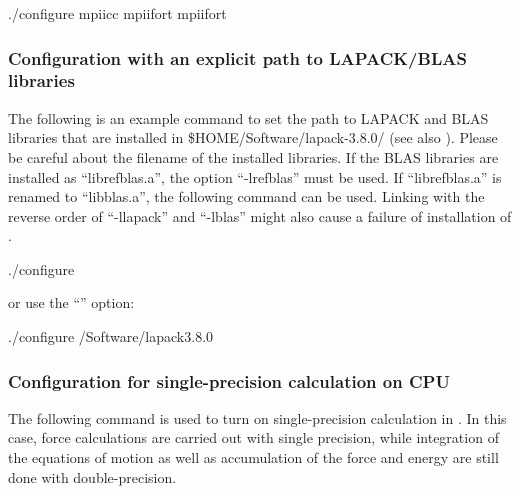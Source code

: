 \documentclass[a4paper,11pt,oneside,english]{sphinxmanual}
\begin{document}
\begin{sphinxVerbatim}[commandchars=\\\{\}]
\PYGZdl{} ./configure mpiicc mpiifort mpiifort
\end{sphinxVerbatim}


\subsubsection{Configuration with an explicit path to LAPACK/BLAS libraries}
\label{\detokenize{01_Getting_Started:configuration-with-an-explicit-path-to-lapack-blas-libraries}}
The following is an example command to set the path to LAPACK and BLAS libraries
that are installed in \$HOME/Software/lapack-3.8.0/ (see also {\hyperref[\detokenize{98_Appendix:appendix}]{}}).
Please be careful about the filename of the installed libraries.
If the BLAS libraries are installed as “librefblas.a”, the option “-lrefblas” must be used.
If “librefblas.a” is renamed to “libblas.a”, the following command can be used.
Linking with the reverse order of “-llapack” and “-lblas” might
also cause a failure of installation of .

\begin{sphinxVerbatim}[commandchars=\\\{\}]
\PYGZdl{} ./configure 
\end{sphinxVerbatim}

or use the “” option:

\begin{sphinxVerbatim}[commandchars=\\\{\}]
\PYGZdl{} ./configure /Software/lapack\PYGZhy{}3.8.0
\end{sphinxVerbatim}


\subsubsection{Configuration for single-precision calculation on CPU}
\label{\detokenize{01_Getting_Started:configuration-for-single-precision-calculation-on-cpu}}
The following command is used to turn on single-precision calculation in .
In this case, force calculations are carried out with single precision,
while integration of the equations of motion as well as
accumulation of the force and energy are still done with double-precision.
\end{document}

